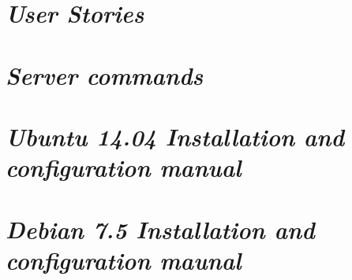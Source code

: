 \begin{appendix}

\chapter{\textit{User Stories}}

\chapter{\textit{Server commands}}

\chapter{\textit{Ubuntu 14.04 Installation and configuration manual}}

\chapter{\textit{Debian 7.5 Installation and configuration maunal}}

\end{appendix}
